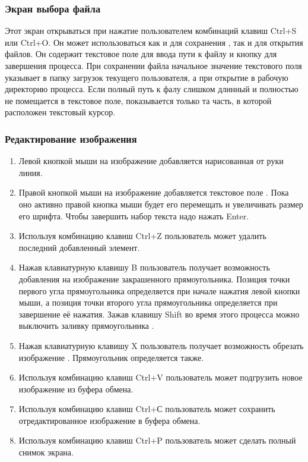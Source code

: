 \documentclass[a4paper,12pt]{article}
\begin{document}
  \subsubsection{Экран выбора файла}
  Этот экран открываться при нажатие пользователем комбинаций клавиш Ctrl+S или Ctrl+O.
  Он может использоваться как и для сохранения , так и для открытия  файлов.
  Он содержит текстовое поле для ввода пути к файлу и кнопку для завершения процесса.
  При сохранении файла начальное значение текстового поля указывает в папку загрузок текущего пользователя,
  а при открытие в рабочую директорию процесса.
  Если полный путь к фалу слишком длинный и полностью не помещается в текстовое поле, показывается только та часть, в которой расположен текстовый курсор.

  \subsubsection{Редактирование изображения}
  \begin{enumerate}
    \item Левой кнопкой мыши на изображение добавляется нарисованная от руки линия.
    \item Правой кнопкой мыши на изображение добавляется текстовое поле .
    Пока оно активно правой кнопка мыши будет его перемещать и увеличивать размер его шрифта.
    Чтобы завершить набор текста надо нажать Enter.
    \item Используя комбинацию клавиш Ctrl+Z пользователь может удалить последний добавленный элемент.
    \item Нажав клавиатурную клавишу B пользователь получает возможность добавления на изображение закрашенного прямоугольника.
    Позиция точки первого угла прямоугольника определяется при начале нажатия левой кнопки мыши,
    а позиция точки второго угла прямоугольника определяется при завершение её нажатия.
    Зажав клавишу Shift во время этого процесса можно выключить заливку прямоугольника .
    \item Нажав клавиатурную клавишу X пользователь получает возможность обрезать изображение . Прямоугольник определяется также.
    \item Используя комбинацию клавиш Ctrl+V пользователь может подгрузить новое изображение из буфера обмена.
    \item Используя комбинацию клавиш Ctrl+С пользователь может сохранить отредактированное изображение в буфера обмена.
    \item Используя комбинацию клавиш Ctrl+P пользователь может сделать полный снимок экрана.
  \end{enumerate}


  \begin{CRTbibliography}
  \end{CRTbibliography}

  \CRTterminology

  \CRTlistRegistration
\end{document}
